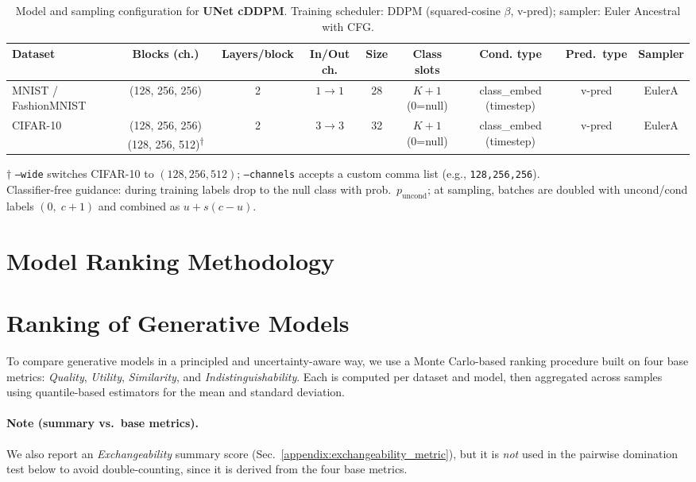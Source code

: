 \begin{table}[H]
\centering
\scriptsize
\caption{Model and sampling configuration for \textbf{UNet cDDPM}. Training scheduler: DDPM (squared-cosine $\beta$, v-pred); sampler: Euler Ancestral with CFG.}
\label{tab:unetddpm-model}
\begin{adjustbox}{max width=\linewidth}
\begin{tabular}{@{}lcccccccc@{}}
\toprule
Dataset & Blocks (ch.) & Layers/block & In/Out ch. & Size & Class slots & Cond. type & Pred.\ type & Sampler \\
\midrule
MNIST / FashionMNIST & (128, 256, 256) & 2 & $1\to1$ & 28 & $K{+}1$ (0=null) & class\_embed (timestep) & v-pred & EulerA \\
CIFAR-10        & (128, 256, 256)\;{\small or}\;(128, 256, 512)\textsuperscript{$\dagger$} & 2 & $3\to3$ & 32 & $K{+}1$ (0=null) & class\_embed (timestep) & v-pred & EulerA \\
\bottomrule
\end{tabular}
\end{adjustbox}

\vspace{2pt}\footnotesize
$\dagger$ \texttt{--wide} switches CIFAR-10 to $(128,256,512)$; \texttt{--channels} accepts a custom comma list (e.g., \texttt{128,256,256}).\\
Classifier-free guidance: during training labels drop to the null class with prob.\ $p_{\text{uncond}}$; at sampling, batches are doubled with uncond/cond labels $(0,\;c{+}1)$ and combined as $u + s(c{-}u)$.
\end{table}


\section{Model Ranking Methodology}
\label{appendix:ranking}

\section{Ranking of Generative Models}

To compare generative models in a principled and uncertainty-aware way, we use a Monte Carlo-based ranking procedure built on four base metrics: \emph{Quality}, \emph{Utility}, \emph{Similarity}, and \emph{Indistinguishability}. Each is computed per dataset and model, then aggregated across samples using quantile-based estimators for the mean and standard deviation.

\paragraph{Note (summary vs.\ base metrics).}
We also report an \emph{Exchangeability} summary score (Sec.~\ref{appendix:exchangeability_metric}), but it is \emph{not} used in the pairwise domination test below to avoid double-counting, since it is derived from the four base metrics.

